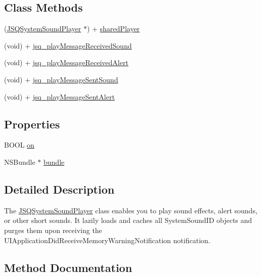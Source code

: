 \subsection*{Class Methods}
\begin{DoxyCompactItemize}
\item 
(\hyperlink{interface_j_s_q_system_sound_player}{J\+S\+Q\+System\+Sound\+Player} $\ast$) + \hyperlink{interface_j_s_q_system_sound_player_acd1a2295361c112fcfeccf4c797d3ad2}{shared\+Player}
\item 
(void) + \hyperlink{interface_j_s_q_system_sound_player_a4fb177fa49a0a184b0335ded7a27b267}{jsq\+\_\+play\+Message\+Received\+Sound}
\item 
(void) + \hyperlink{interface_j_s_q_system_sound_player_a9cbbf194debd5c11bfd8d2f57edd509c}{jsq\+\_\+play\+Message\+Received\+Alert}
\item 
(void) + \hyperlink{interface_j_s_q_system_sound_player_a21462f78a8f5a4715c14936141e5f085}{jsq\+\_\+play\+Message\+Sent\+Sound}
\item 
(void) + \hyperlink{interface_j_s_q_system_sound_player_ae8a8ebbe7039de1656a495d10bfd1ccb}{jsq\+\_\+play\+Message\+Sent\+Alert}
\end{DoxyCompactItemize}
\subsection*{Properties}
\begin{DoxyCompactItemize}
\item 
B\+O\+O\+L \hyperlink{interface_j_s_q_system_sound_player_acfbac062deb875d2818c5565c80602ad}{on}
\item 
N\+S\+Bundle $\ast$ \hyperlink{interface_j_s_q_system_sound_player_a7ffd82c67a99e926282624b897e1fa1d}{bundle}
\end{DoxyCompactItemize}


\subsection{Detailed Description}
The {\ttfamily \hyperlink{interface_j_s_q_system_sound_player}{J\+S\+Q\+System\+Sound\+Player}} class enables you to play sound effects, alert sounds, or other short sounds. It lazily loads and caches all {\ttfamily System\+Sound\+I\+D} objects and purges them upon receiving the {\ttfamily U\+I\+Application\+Did\+Receive\+Memory\+Warning\+Notification} notification. 

\subsection{Method Documentation}
\hypertarget{interface_j_s_q_system_sound_player_a9cbbf194debd5c11bfd8d2f57edd509c}{}
